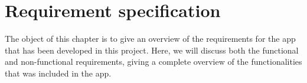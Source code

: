 \chapter{Requirement specification}
\label{sec:recSpecification}

The object of this chapter is to give an overview of the requirements for the app that has been developed in this project. Here, we will discuss both the functional and non-functional requirements, giving a complete overview of the functionalities that was included in the app.



\newpage
